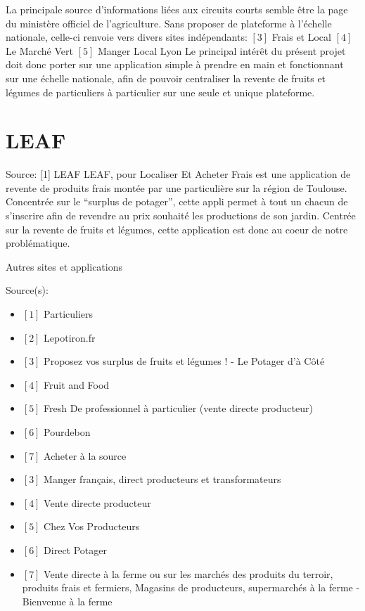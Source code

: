 La principale source d’informations liées aux circuits courts semble être la page du ministère officiel de l’agriculture. Sans proposer de plateforme à l’échelle nationale, celle-ci renvoie vers divers sites indépendants:
	$[3]$ Frais et Local
	$[4]$ Le Marché Vert
	$[5]$ Manger Local Lyon
Le principal intérêt du présent projet doit donc porter sur une application simple à prendre en main et fonctionnant sur une échelle nationale, afin de pouvoir centraliser la revente de fruits et légumes de particuliers à particulier sur une seule et unique plateforme.


\section*{LEAF}
	Source: [1] LEAF
LEAF, pour Localiser Et Acheter Frais est une application de revente de produits frais montée par une particulière sur la région de Toulouse. Concentrée sur le “surplus de potager”, cette appli permet à tout un chacun de s’inscrire afin de revendre au prix souhaité les productions de son jardin.
Centrée sur la revente de fruits et légumes, cette application est donc au coeur de notre problématique.

Autres sites et applications

	Source(s):
	\begin{itemize}
	De particulier à particulier
	\item $[1]$ Particuliers
	\item $[2]$ Lepotiron.fr
	\item $[3]$ Proposez vos surplus de fruits et légumes ! - Le Potager d'à Côté
	\item $[4]$ Fruit and Food
	\item $[5]$ Fresh
De professionnel à particulier (vente directe producteur)
\item $[6]$ Pourdebon
\item $[7]$ Acheter à la source
\item $[3]$ Manger français, direct producteurs et transformateurs
\item $[4]$ Vente directe producteur
\item $[5]$ Chez Vos Producteurs
\item $[6]$ Direct Potager
\item $[7]$ Vente directe à la ferme ou sur les marchés des produits du terroir, produits frais et fermiers, Magasins de producteurs, supermarchés à la ferme - Bienvenue à la ferme
\end{itemize}


